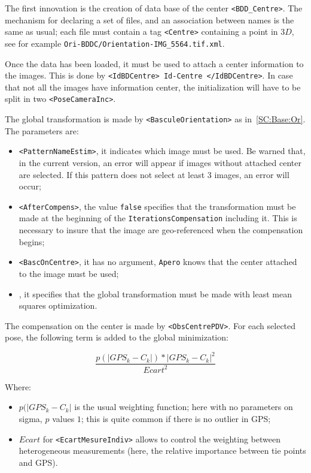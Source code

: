 The first innovation is the creation of data base of the center {\tt <BDD\_Centre>}.
The mechanism for declaring a set of files, and an association between names 
is the same as usual; each file must contain a tag {\tt  <Centre>}
containing a point in $3D$, see for example {\tt Ori-BDDC/Orientation-IMG\_5564.tif.xml}.

Once the data has been loaded, it must be used to attach a center information
to the images. This is done by  {\tt  <IdBDCentre> Id-Centre </IdBDCentre>}.
In case that not all the images have information center, the 
initialization will have to be split in two {\tt <PoseCameraInc>}.

The global transformation is made by {\tt  <BasculeOrientation>} as in~\ref{SC:Base:Or}.
The parameters are:

  
\begin{itemize}
   \item {\tt <PatternNameEstim>}, it indicates which image must be used. Be warned that, in the
          current version, an error will appear if images without attached center are selected.
          If this pattern does not select at least $3$ images, an error will occur;

   \item  {\tt  <AfterCompens>}, the value {\tt false} specifies that the transformation 
          must be made at the beginning of the {\tt IterationsCompensation} including it. This
          is necessary to insure that the image are geo-referenced when the compensation begins;

    \item {\tt  <BascOnCentre>}, it has no argument, {\tt Apero} knows that the center attached to
          the image must be used;

    \item {\tt <ModeL2>}, it specifies that the global transformation must be made with least mean
          squares optimization.

\end{itemize}


The compensation on the center is made by {\tt <ObsCentrePDV>}. For each selected pose,
the following term is added to the global minimization:


\begin{equation}
       \frac{p(|GPS_k-C_k|) * |GPS_k-C_k|^2}{Ecart^2}
\end{equation}

Where:

\begin{itemize}
    \item $p(|GPS_k-C_k|$ is the usual weighting function; here with no parameters on sigma,
          $p$ values $1$; this is quite common if there is no outlier in GPS;


    \item $Ecart$ for {\tt <EcartMesureIndiv>} allows to control the weighting between 
          heterogeneous measurements (here, the relative importance between tie points and GPS).
\end{itemize}


